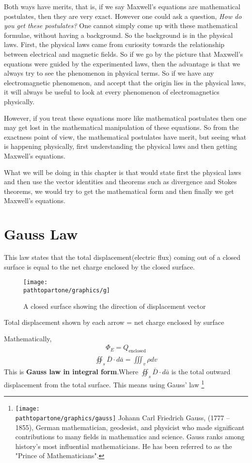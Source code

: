 Both ways have merits, that is, if we say Maxwell's equations are mathematical postulates, then they are very exact. However one could ask a question, \emph{How do you get these postulates?} One cannot simply come up with these mathematical formulae, without having a background. So the background is in the physical laws. First, the physical laws came from curiosity towards the relationship between electrical and magnetic fields. So if we go by the picture that Maxwell's equations were guided by the experimented laws, then the advantage is that we always try to see the phenomenon in physical terms. So if we have any electromagnetic phenomenon, and accept that the origin lies in the physical laws, it will always be useful to look at every phenomenon of electromagnetics physically.

However, if you treat these equations more like mathematical postulates then one may get lost in the mathematical manipulation of these equations. So from the exactness point of view, the mathematical postulates have merit, but seeing what is happening physically, first understanding the physical laws and then getting Maxwell's equations.

What we will be doing in this chapter is that would state first the physical laws and then use the vector identities and theorems such as divergence and Stokes theorems, we would try to get the mathematical form and then finally we get Maxwell's equations.

\section{Gauss Law}
This law states that the total displacement(electric flux) coming out of a closed surface is equal to the net charge enclosed by the closed surface.

\begin{figure}[h]
\centering
\texttt{[image: \\pathtopartone/graphics/g]}
\caption{A closed surface showing the direction of displacement vector}
\label{fig:g}
\end{figure}
Total displacement shown by each arrow = net charge enclosed by surface

Mathematically, 
\begin{align}
\Phi_E = Q_{\text{enclosed}}
\end{align}
\begin{align}
\boxed{\oiint_s\bar{D}\cdot{d\bar{a}} = \iiint_v\rho dv}
\end{align}
This is \textbf{Gauss law in integral form}.Where $\oiint_s\bar{D}\cdot d\bar{a}$ is the total outward displacement from the total surface. This means using Gauss' law
\footnote[5]{\texttt{[image: \\pathtopartone/graphics/gauss]} 
Johann Carl Friedrich Gauss, (1777 – 1855), German mathematician, geodesist, and physicist who made significant contributions to many fields in mathematics and science. Gauss ranks among history's most influential mathematicians. He has been referred to as the "Prince of Mathematicians". 
}

